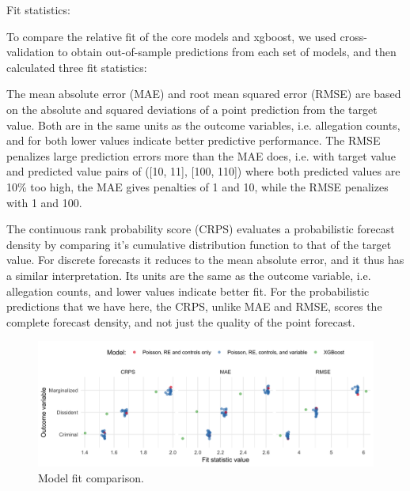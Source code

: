 \documentclass[12pt]{article}
\begin{document}
Fit statistics:

To compare the relative fit of the core models and xgboost, we used cross-validation to obtain out-of-sample predictions from each set of models, and then calculated three fit statistics:

The mean absolute error (MAE) and root mean squared error (RMSE) are based on the absolute and squared deviations of a point prediction from the target value. Both are in the same units as the outcome variables, i.e. allegation counts, and for both lower values indicate better predictive performance. The RMSE penalizes large prediction errors more than the MAE does, i.e. with target value and predicted value pairs of ([10, 11], [100, 110]) where both predicted values are 10\% too high, the MAE gives penalties of 1 and 10, while the RMSE penalizes with 1 and 100. 

The continuous rank probability score (CRPS) evaluates a probabilistic forecast density by comparing it's cumulative distribution function to that of the target value. For discrete forecasts it reduces to the mean absolute error, and it thus has a similar interpretation. Its units are the same as the outcome variable, i.e. allegation counts, and lower values indicate better fit. For the probabilistic predictions that we have here, the CRPS, unlike MAE and RMSE, scores the complete forecast density, and not just the quality of the point forecast. 

\begin{figure}
\caption{Model fit comparison.}
\includegraphics[width=.9\textwidth]{../output/figures/oos-fit-all.png}
\end{figure}










\end{document}
